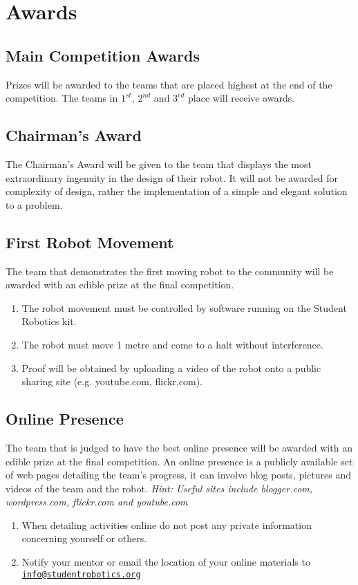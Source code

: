 \section {Awards}
\label{sec:Awards}

\subsection{Main Competition Awards}
Prizes will be awarded to the teams that are placed highest at the end of the competition.  The teams in $1^{st}$, $2^{nd}$ and $3^{rd}$ place will receive awards.

\subsection{Chairman's Award}
The Chairman's Award will be given to the team that displays the most extraordinary ingenuity in the design of their robot.  It will not be awarded for complexity of design, rather the implementation of a simple and elegant solution to a problem.

\subsection{First Robot Movement}
The team that demonstrates the first moving robot to the community will be awarded with an edible prize at the final competition.
\begin{enumerate}
\item The robot movement must be controlled by software running on the Student Robotics kit.
\item The robot must move 1 metre and come to a halt without interference.
\item Proof will be obtained by uploading a video of the robot onto a public sharing site (e.g. youtube.com, flickr.com).
\end{enumerate}


\subsection{Online Presence}
The team that is judged to have the best online presence will be awarded with an edible prize at the final competition.  An online presence is a publicly available set of web pages detailing the team's progress, it can involve blog posts, pictures and videos of the team and the robot.  \emph{Hint: Useful sites include blogger.com, wordpress.com, flickr.com and youtube.com}
\begin{enumerate}
\item When detailing activities online do not post any private information concerning yourself or others.
\item Notify your mentor or email the location of your online materials to \linebreak\href{mailto:info@studentrobotics.org}{\nolinkurl{info@studentrobotics.org}}
\end{enumerate}
